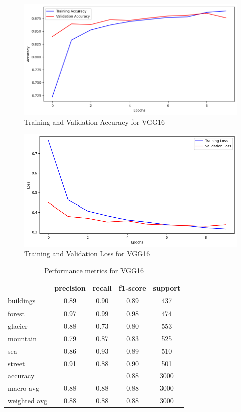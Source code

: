 \documentclass[conference]{IEEEtran}
\begin{document}
\begin{figure}[H]
    \centering
    \includegraphics[width=1\linewidth]{images//VGG16/Testing_Validation_Accuracy_VGG16.png}
    \caption{Training and Validation Accuracy for VGG16}
    \label{fig:TV_Accuracy_VGG16}
\end{figure}


\begin{figure}[H]
    \centering
    \includegraphics[width=1\linewidth]{images//VGG16/Training_Validation_Loss_VGG16.png}
    \caption{Training and Validation Loss for VGG16}
    \label{fig:TV_Loss_VGG16}
\end{figure}

\begin{table}[H]
\centering
\begin{tabular}{lcccc}
\toprule
\textbf{} & \textbf{precision} & \textbf{recall} & \textbf{f1-score} & \textbf{support} \\
\midrule
buildings & 0.89 & 0.90 & 0.89 & 437 \\
forest & 0.97 & 0.99 & 0.98 & 474 \\
glacier & 0.88 & 0.73 & 0.80 & 553 \\
mountain & 0.79 & 0.87 & 0.83 & 525 \\
sea & 0.86 & 0.93 & 0.89 & 510 \\
street & 0.91 & 0.88 & 0.90 & 501 \\
\midrule
accuracy & & & 0.88 & 3000 \\
macro avg & 0.88 & 0.88 & 0.88 & 3000 \\
weighted avg & 0.88 & 0.88 & 0.88 & 3000 \\
\bottomrule
\end{tabular}
\caption{Performance metrics for VGG16}
\end{table}
\end{document}
